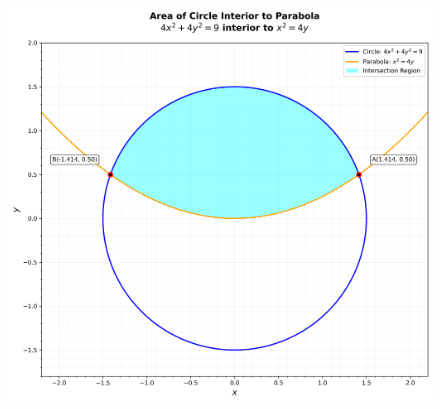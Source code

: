 \documentclass[article]{IEEEtran}
\begin{document}
\begin{figure}[H]
	\centering
	\includegraphics[width=1\linewidth]{figs/area_plot}
\end{figure}
\end{document}
